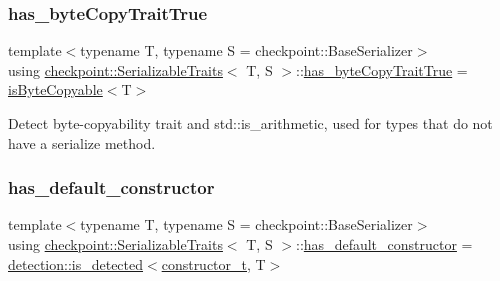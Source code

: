 \subsubsection{\texorpdfstring{has\+\_\+byte\+Copy\+Trait\+True}{has\_byteCopyTraitTrue}}
{\footnotesize\ttfamily template$<$typename T, typename S = checkpoint\+::\+Base\+Serializer$>$ \\
using \hyperlink{structcheckpoint_1_1_serializable_traits}{checkpoint\+::\+Serializable\+Traits}$<$ T, S $>$\+::\hyperlink{structcheckpoint_1_1_serializable_traits_a8e42305be1264b105f525ae7dff36c15}{has\+\_\+byte\+Copy\+Trait\+True} =  \hyperlink{structcheckpoint_1_1is_byte_copyable}{is\+Byte\+Copyable}$<$T$>$}

Detect byte-\/copyability trait and std\+::is\+\_\+arithmetic, used for types that do not have a serialize method. \mbox{\label{structcheckpoint_1_1_serializable_traits_a824afd2953233388cbc3223a82c75df8}} 
\subsubsection{\texorpdfstring{has\+\_\+default\+\_\+constructor}{has\_default\_constructor}}
{\footnotesize\ttfamily template$<$typename T, typename S = checkpoint\+::\+Base\+Serializer$>$ \\
using \hyperlink{structcheckpoint_1_1_serializable_traits}{checkpoint\+::\+Serializable\+Traits}$<$ T, S $>$\+::\hyperlink{structcheckpoint_1_1_serializable_traits_a824afd2953233388cbc3223a82c75df8}{has\+\_\+default\+\_\+constructor} =  \hyperlink{namespacedetection_a30893549a3de1e9603d78dad6d5dce92}{detection\+::is\+\_\+detected}$<$\hyperlink{structcheckpoint_1_1_serializable_traits_aa0430155930461d346b90681db234d84}{constructor\+\_\+t}, T$>$}

\mbox{\label{structcheckpoint_1_1_serializable_traits_a8a8b20be974e219f4fb39b4346be0536}} 

